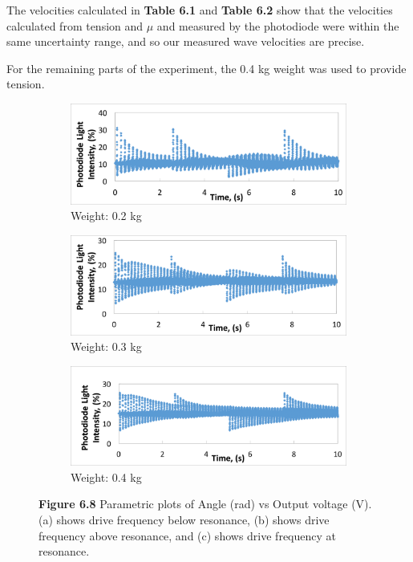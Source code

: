 \documentclass[11pt]{report}
\begin{document}
\setlength{\parindent}{5ex}
The velocities calculated in \textbf{Table 6.1} and \textbf{Table 6.2} show that
the velocities calculated from tension and $\mu$ and measured by the photodiode 
were within the same uncertainty range, and so our measured wave velocities are
precise.  

For the remaining parts of the experiment, the 0.4 kg weight was used to provide
tension. 

\begin{figure}
    \begin{subfigure}{\textwidth}
        \centering
        \includegraphics[width=0.95\linewidth]{LightIntensity1.png}
        \caption{Weight: 0.2 kg}
    \end{subfigure}
    \begin{subfigure}{\textwidth}
        \centering
        \includegraphics[width=0.95\linewidth]{LightIntensity2.png}
        \caption{Weight: 0.3 kg}
    \end{subfigure}
    \begin{subfigure}{\textwidth}
        \centering
        \includegraphics[width=\linewidth]{LightIntensity3.png}
        \caption{Weight: 0.4 kg}
    \end{subfigure}
    \captionsetup{labelformat=empty}
    \caption{\textbf{Figure 6.8 }
        Parametric plots of Angle (rad) vs Output voltage (V). (a) shows drive
    frequency below resonance, (b) shows drive frequency above resonance, and (c)
shows drive frequency at resonance.}
\end{figure}
\end{document}
